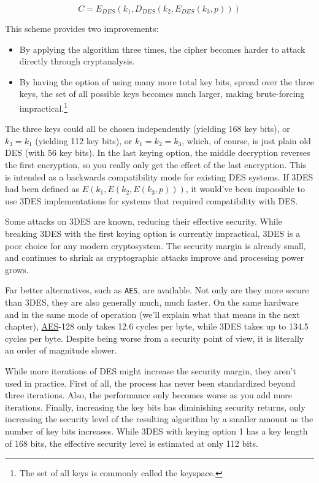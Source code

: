 \documentclass[11pt,ebook,table,dvipsnames]{memoir}
\begin{document}
\begin{equation}
C = E_{DES}(k_1, D_{DES}(k_2, E_{DES}(k_3, p)))
\end{equation}

This scheme provides two improvements:

\begin{itemize}
\item By applying the algorithm three times, the cipher becomes harder to
attack directly through cryptanalysis.
\item By having the option of using many more total key bits, spread over
the three keys, the set of all possible keys becomes much larger,
making brute-forcing impractical.\footnote{The set of all keys is
   commonly called the keyspace.}
\end{itemize}

The three keys could all be chosen independently (yielding 168 key
bits), or $k_3 = k_1$ (yielding 112 key bits), or $k_1 = k_2 = k_3$,
which, of course, is just plain old DES (with 56 key bits). In the
last keying option, the middle decryption reverses the first
encryption, so you really only get the effect of the last encryption.
This is intended as a backwards compatibility mode for existing DES
systems. If 3DES had been defined as $E(k_1, E(k_2, E(k_3, p)))$, it
would've been impossible to use 3DES implementations for systems that
required compatibility with DES.

Some attacks on 3DES are known, reducing their effective security.
While breaking 3DES with the first keying option is currently
impractical, 3DES is a poor choice for any modern cryptosystem. The
security margin is already small, and continues to shrink as
cryptographic attacks improve and processing power grows.

Far better alternatives, such as \texttt{AES}, are available. Not only are they
more secure than 3DES, they are also generally much, much faster. On
the same hardware and in the same \gls{mode of operation} (we'll
explain what that means in the next chapter), \hyperref[AES]{AES}-128 only takes 12.6
cycles per byte, while 3DES takes up to 134.5 cycles per byte.
\cite{cryptopp:bench} Despite being worse from a security point of
view, it is literally an order of magnitude slower.

While more iterations of DES might increase the security margin, they
aren't used in practice. First of all, the process has never been
standardized beyond three iterations. Also, the performance only
becomes worse as you add more iterations. Finally, increasing the key
bits has diminishing security returns, only increasing the security
level of the resulting algorithm by a smaller amount as the number of
key bits increases. While 3DES with keying option 1 has a key length
of 168 bits, the effective security level is estimated at only 112
bits.
\end{document}
